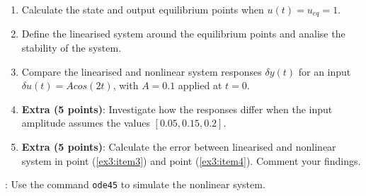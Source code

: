 \documentclass[a4paper,11pt]{article}
\begin{document}
\begin{enumerate}
\item Calculate the state and output equilibrium points when $u(t)=u_{eq}=1$.
\item Define the linearised system around the equilibrium points and analise the stability of the system.
\item \label{ex3:item3} Compare the linearised and nonlinear system responses $\delta y(t)$ for an input $\delta u(t)=A cos(2t)$, with $A=0.1$ applied at $t=0$.
\item \label{ex3:item4} {\bf Extra (5 points)}: Investigate how the responses differ when the input amplitude assumes the values $[0.05, 0.15, 0.2]$. 
\item {\bf Extra (5 points)}: Calculate the error between linearised and nonlinear system in point (\ref{ex3:item3}) and point (\ref{ex3:item4}). Comment your findings.
\end{enumerate}

: Use the command {\tt ode45} to simulate the nonlinear system.
\end{document}
